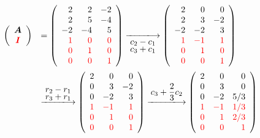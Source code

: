 \begin{frame}
  \begin{jie}
    $$
    \begin{array}{rl}
      \left(
      \begin{array}{c}
        \MA\\
        \red{\MI}
      \end{array}
      \right)&=\left(
      \begin{array}{rrr}
        2&2&-2\\
        2&5&-4\\
        -2&-4&5\\
        \red{1}&\red{0}&\red{0}\\
        \red{0}&\red{1}&\red{0}\\
        \red{0}&\red{0}&\red{1}
      \end{array}
      \right)\xlongrightarrow[\ds c_2-c_1\atop \ds c_3+c_1]{}
      \left(
      \begin{array}{rrr}
        2&0&0\\
        2&3&-2\\
        -2&-2&3\\
        \red{1}&\red{-1}&\red{1}\\
        \red{0}&\red{1}&\red{0}\\
        \red{0}&\red{0}&\red{1}
      \end{array}
      \right)\\[0.5in]
      &\xlongrightarrow[]{\ds r_2-r_1\atop \ds r_3+r_1}
      \left(
      \begin{array}{rrr}
        2&0&0\\
        0&3&-2\\
        0&-2&3\\
        \red{1}&\red{-1}&\red{1}\\
        \red{0}&\red{1}&\red{0}\\
        \red{0}&\red{0}&\red{1}
      \end{array}
      \right)\xlongrightarrow[]{\ds c_3+\frac23c_2}
      \left(
      \begin{array}{rrr}
        2&0&0\\
        0&3&0\\
        0&-2&\ds5/3\\
        \red{1}&\red{-1}&\red{1/3}\\
        \red{0}&\red{1}&\red{2/3}\\
        \red{0}&\red{0}&\red{1}
      \end{array}
      \right)\\[0.5in]

\end{array}$$
\end{jie}
\end{frame}

